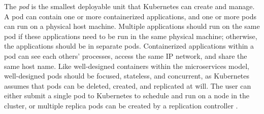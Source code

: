 The \textit{pod} is the smallest deployable unit that Kubernetes can create and
manage. A pod can contain one or more
containerized applications, and one or more pods can run on a physical host
machine. Multiple applications should run on the same pod
if these applications need to be run in the same
physical machine; otherwise, the applications should be in separate pods.
Containerized applications within a pod can see each others' processes,
access the same IP network, and share the same host name. Like well-designed
containers within the microservices model, well-designed pods should be
focused, stateless, and concurrent, as Kubernetes assumes that pods can be deleted,
created, and replicated at will. The user can either submit a
single pod to Kubernetes to schedule and run on a node in the cluster, or
multiple replica pods
can be created by a replication controller \cite{k8s-pods}.
